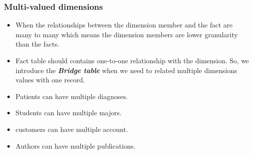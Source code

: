 \VideoClassification[column=1, colour=blue]
\begin{frame}
	\frametitle{Multi-valued dimensions}
	\begin{itemize}[<+->]
		\item When the relationships between the dimension member and the fact are many to many which means the dimension members are lower granularity than the facts. 
		\item Fact table should contains one-to-one relationship with the dimension. So, we introduce the \textbf{\textit{Bridge table}} when we need to related multiple dimensions values with one record.
	\end{itemize}
	
	\begin{example}
		\begin{itemize}[<+->]
			\item Patients can have multiple diagnoses.
			\item Students can have multiple majors.
			\item customers can have multiple account.
			\item Authors can have multiple publications.
		\end{itemize}
	\end{example}		
	
\end{frame}
